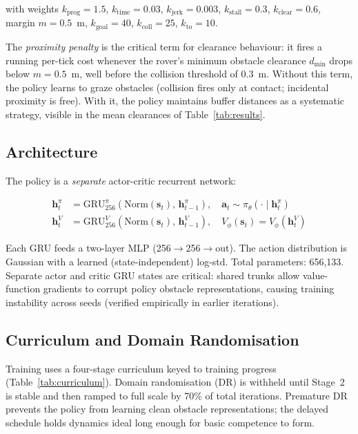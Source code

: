 \documentclass[letterpaper, 10pt, journal]{IEEEtran}
\begin{document}
\noindent with weights $k_{\mathrm{prog}}{=}1.5$, $k_{\mathrm{time}}{=}0.03$,
$k_{\mathrm{jerk}}{=}0.003$, $k_{\mathrm{stall}}{=}0.3$,
$k_{\mathrm{clear}}{=}0.6$, margin $m{=}0.5$~m,
$k_{\mathrm{goal}}{=}40$, $k_{\mathrm{coll}}{=}25$, $k_{\mathrm{to}}{=}10$.

The \emph{proximity penalty} is the critical term for clearance behaviour: it fires a
running per-tick cost whenever the rover's minimum obstacle clearance $d_{\min}$ drops
below $m = 0.5$~m, well before the collision threshold of 0.3~m. Without this term,
the policy learns to graze obstacles (collision fires only at contact; incidental
proximity is free). With it, the policy maintains buffer distances as a systematic
strategy, visible in the mean clearances of Table~\ref{tab:results}.

\subsection{Architecture}

The policy is a \emph{separate} actor-critic recurrent network:

\begin{equation}
\begin{aligned}
\mathbf{h}^{\pi}_{t} &= \mathrm{GRU}_{256}^{\pi}\!\left(\mathrm{Norm}(\mathbf{s}_t),\,\mathbf{h}^{\pi}_{t-1}\right),\quad
\mathbf{a}_t \sim \pi_\theta\!\left(\cdot \mid \mathbf{h}^{\pi}_{t}\right) \\
\mathbf{h}^{V}_{t} &= \mathrm{GRU}_{256}^{V}\!\left(\mathrm{Norm}(\mathbf{s}_t),\,\mathbf{h}^{V}_{t-1}\right),\quad
V_\phi(\mathbf{s}_t) = V_\phi\!\left(\mathbf{h}^{V}_{t}\right)
\end{aligned}
\end{equation}

\noindent Each GRU feeds a two-layer MLP (256$\to$256$\to$out). The action
distribution is Gaussian with a learned (state-independent) log-std.
Total parameters: 656,133. Separate actor and critic GRU states are critical: shared
trunks allow value-function gradients to corrupt policy obstacle representations,
causing training instability across seeds (verified empirically in earlier
iterations).

\subsection{Curriculum and Domain Randomisation}

Training uses a four-stage curriculum keyed to training progress
(Table~\ref{tab:curriculum}). Domain randomisation (DR) is withheld until Stage~2 is
stable and then ramped to full scale by 70\% of total iterations. Premature DR
prevents the policy from learning clean obstacle representations; the delayed schedule
holds dynamics ideal long enough for basic competence to form.
\end{document}
